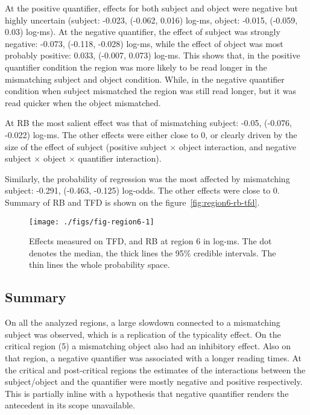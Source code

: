 At the positive quantifier, effects for both subject and object were negative but highly uncertain (subject: -0.023, (-0.062, 0.016) log-ms, object: -0.015, (-0.059, 0.03) log-ms). At the negative quantifier, the effect of subject was strongly negative: -0.073, (-0.118, -0.028) log-ms, while the effect of object was most probably positive: 0.033, (-0.007, 0.073) log-ms.
This shows that, in the positive quantifier condition the region was more likely to be read longer in the mismatching subject and object condition. While, in the negative quantifier condition when subject mismatched the region was still read longer, but it was read quicker when the object mismatched.

At RB the most salient effect was that of mismatching subject: -0.05, (-0.076, -0.022) log-ms. The other effects were either close to 0, or clearly driven by the size of the effect of subject (positive subject $\times$ object interaction, and negative subject $\times$ object $\times$ quantifier interaction).

Similarly, the probability of regression was the most affected by mismatching subject: -0.291, (-0.463, -0.125) log-odds. The other effects were close to 0.
Summary of RB and TFD is shown on the figure~\ref{fig:region6-rb-tfd}.

\begin{knitrout}
\color{fgcolor}\begin{figure}
\texttt{[image: ./figs/fig-region6-1]} \caption{\label{fig:region6-rb-tfd}Effects measured on TFD, and RB at region 6 in log-ms. The dot denotes the median, the thick lines the 95\% credible intervals. The thin lines the whole probability space.}\label{fig:fig-region6}
\end{figure}


\end{knitrout}

\subsection{Summary}

On all the analyzed regions, a large slowdown connected to a mismatching subject was observed, which is a replication of the typicality effect. On the critical region (5) a mismatching object also had an inhibitory effect.
Also on that region, a negative quantifier was associated with a longer reading times. At the critical and post-critical regions the estimates of the interactions between the subject/object and the quantifier were mostly negative and positive respectively. This is partially inline with a hypothesis that negative quantifier renders the antecedent in its scope unavailable.

